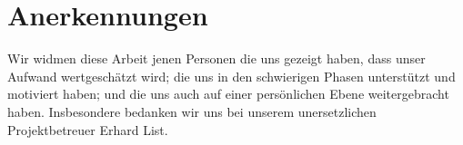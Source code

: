 \section*{Anerkennungen}

Wir widmen diese Arbeit jenen Personen die uns gezeigt haben, dass unser Aufwand wertgeschätzt wird; die uns in den schwierigen Phasen unterstützt und motiviert haben; und die uns auch auf einer persönlichen Ebene weitergebracht haben. Insbesondere bedanken wir uns bei unserem unersetzlichen Projektbetreuer Erhard List.